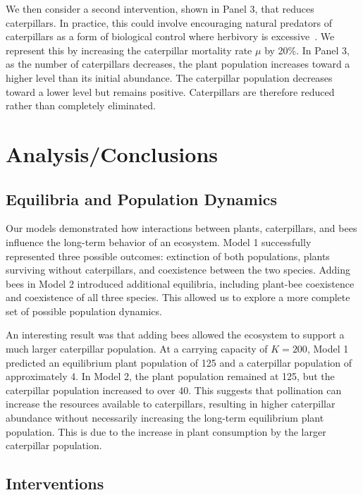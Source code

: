 \documentclass[11pt]{amsart}
\begin{document}
We then consider a second intervention, shown in Panel 3, that reduces caterpillars. In practice, this could involve encouraging natural predators of caterpillars as a form of biological control where herbivory is excessive~\cite{ucipmLeafFeedingCaterpillars}. We represent this by increasing the caterpillar mortality rate $\mu$ by 20\%. In Panel 3, as the number of caterpillars decreases, the plant population increases toward a higher level than its initial abundance. The caterpillar population decreases toward a lower level but remains positive. Caterpillars are therefore reduced rather than completely eliminated.

\section{Analysis/Conclusions}

\subsection{Equilibria and Population Dynamics}

Our models demonstrated how interactions between plants, caterpillars, and bees influence the long-term behavior of an ecosystem. Model 1 successfully represented three possible outcomes: extinction of both populations, plants surviving without caterpillars, and coexistence between the two species. Adding bees in Model 2 introduced additional equilibria, including plant-bee coexistence and coexistence of all three species. This allowed us to explore a more complete set of possible population dynamics.

An interesting result was that adding bees allowed the ecosystem to support a much larger caterpillar population. At a carrying capacity of $K=200$, Model 1 predicted an equilibrium plant population of 125 and a caterpillar population of approximately 4. In Model 2, the plant population remained at 125, but the caterpillar population increased to over 40. This suggests that pollination can increase the resources available to caterpillars, resulting in higher caterpillar abundance without necessarily increasing the long-term equilibrium plant population. This is due to the increase in plant consumption by the larger caterpillar population. 

\subsection{Interventions}
\end{document}
